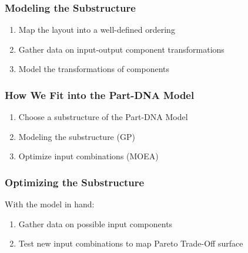 \documentclass{beamer}
\begin{document}
\begin{frame}
\frametitle{Modeling the Substructure}
\begin{enumerate}
\item Map the layout into a well-defined ordering
\item Gather data on input-output component transformations\pause
\item Model the transformations of components
\end{enumerate}
\end{frame}

\begin{frame}
\frametitle{How We Fit into the Part-DNA Model}
\begin{enumerate}
\item Choose a substructure of the Part-DNA Model
\item Modeling the substructure (GP)\pause
\item Optimize input combinations (MOEA)
\end{enumerate}
\end{frame}

\begin{frame}
\frametitle{Optimizing the Substructure}
With the model in hand:
\begin{enumerate}
\item Gather data on possible input components\pause
\item Test new input combinations to map Pareto Trade-Off surface
\end{enumerate}
\end{frame}
\end{document}
